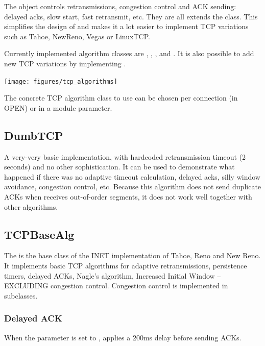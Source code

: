 The  object controls
retransmissions, congestion control and ACK sending: delayed acks, slow start,
fast retransmit, etc. They are all extends the  class.
This simplifies the design of  and makes it a lot easier to
implement TCP variations such as Tahoe, NewReno, Vegas or LinuxTCP.

Currently implemented algorithm classes are ,
, , 
and . It is also possible to add new TCP variations
by implementing .

\texttt{[image: figures/tcp\_algorithms]}

The concrete TCP algorithm class to use can be chosen per connection (in OPEN)
or in a module parameter.

\subsection{DumbTCP}

A very-very basic  implementation, with hardcoded
retransmission timeout (2 seconds) and no other sophistication. It can be
used to demonstrate what happened if there was no adaptive
timeout calculation, delayed acks, silly window avoidance,
congestion control, etc. Because this algorithm does not
send duplicate ACKs when receives out-of-order segments,
it does not work well together with other algorithms.

\subsection{TCPBaseAlg}

The  is the base class of the INET implementation
of Tahoe, Reno and New Reno. It implements basic TCP
algorithms for adaptive retransmissions, persistence timers,
delayed ACKs, Nagle's algorithm, Increased Initial Window
-- EXCLUDING congestion control. Congestion control
is implemented in subclasses.

\subsubsection*{Delayed ACK}

When the  parameter is set to ,
 applies a 200ms delay before sending ACKs.

